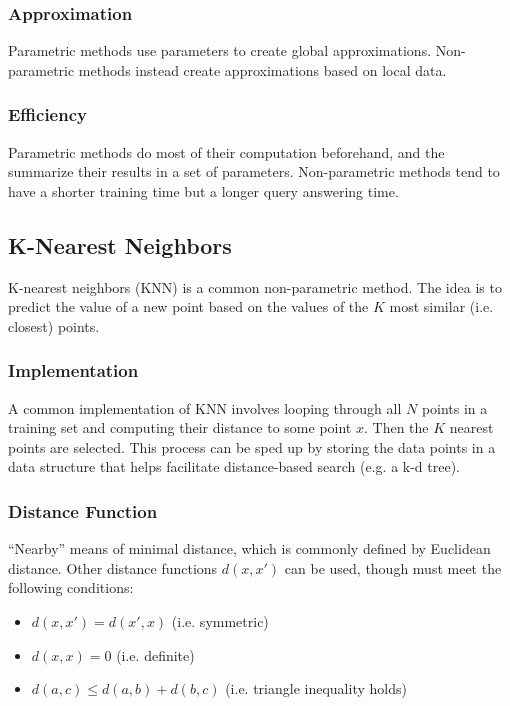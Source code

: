 \documentclass[12pt]{article}
\begin{document}
        \subsubsection{Approximation}
            Parametric methods use parameters to create global approximations. Non-parametric methods instead create
            approximations based on local data.

        \subsubsection{Efficiency}
            Parametric methods do most of their computation beforehand, and the summarize their results in a set of
            parameters. Non-parametric methods tend to have a shorter training time but a longer query answering time.

    \subsection{K-Nearest Neighbors} \label{sec:KNN} K-nearest neighbors (KNN) is a common non-parametric method. The
        idea is to predict the value of a new point based on the values of the $K$ most similar (i.e. closest) points.

        \subsubsection{Implementation}
            A common implementation of KNN involves looping through all $N$ points in a training set and computing their
            distance to some point $x$. Then the $K$ nearest points are selected. This process can be sped up by storing
            the data points in a data structure that helps facilitate distance-based search (e.g. a k-d tree).

        \subsubsection{Distance Function}
            ``Nearby'' means of minimal distance, which is commonly defined by Euclidean distance. Other distance
            functions $d(x, x')$ can be used, though must meet the following conditions:
            \begin{itemize}
              \item $d(x, x') = d(x', x)$ (i.e. symmetric)
              \item $d(x, x) = 0$ (i.e. definite)
              \item $d(a, c) \leq d(a, b) + d(b, c)$ (i.e. triangle inequality holds)
            \end{itemize}
\end{document}
